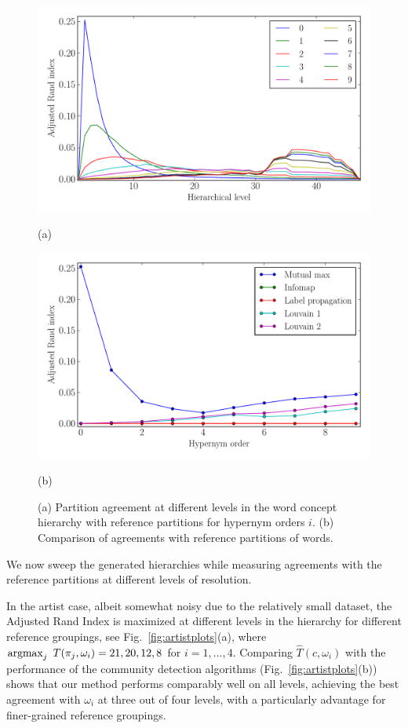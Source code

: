 \documentclass[conference]{IEEEtran}
\newcommand{\fig}[1]{Fig.\ \ref{#1}}
\newcommand{\argmax}{\operatornamewithlimits{argmax}}
\begin{document}
\begin{figure}
\begin{center}
\includegraphics[width=0.9\columnwidth]{figures/1465671278-1465711376-1.pdf}
\centerline{\footnotesize{(a)}}
\includegraphics[width=0.9\columnwidth]{figures/1465671278-1465711376-2.pdf}
\centerline{\footnotesize{(b)}}
\end{center}
\caption{(a) Partition agreement at different levels in the word concept hierarchy with reference partitions for hypernym orders $i$.
(b) Comparison of agreements with reference partitions of words.}
\label{fig:wordplots}
\end{figure}

We now sweep the generated hierarchies while measuring agreements with the reference partitions at different levels of resolution. 

In the artist case, albeit somewhat noisy due to the relatively small dataset, the Adjusted Rand Index is 
maximized at different levels in the hierarchy for different 
reference groupings, see \fig{fig:artistplots}(a), where $ \argmax_j \ T(\pi_j, \omega_i) = 21, 20, 12, 8$ for  $i = 1, ..., 4$.
Comparing $\hat{T}(c, \omega_i)$ with the performance of the community detection algorithms (\fig{fig:artistplots}(b)) shows that our method performs
comparably well on all levels, achieving the best agreement with $\omega_i$ at three out of four levels, with
a particularly advantage for finer-grained reference groupings.
\end{document}
